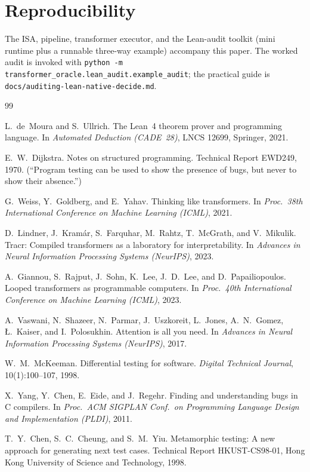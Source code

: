 \documentclass[11pt]{article}
\theoremstyle{definition}
\theoremstyle{plain}
\theoremstyle{remark}
\begin{document}
\section*{Reproducibility}
The ISA, pipeline, transformer executor, and the Lean-audit toolkit (mini runtime plus a runnable
three-way example) accompany this paper. The worked audit is invoked with
\texttt{python -m transformer\_oracle.lean\_audit.example\_audit}; the practical guide is
\texttt{docs/auditing-lean-native-decide.md}.

\begin{thebibliography}{99}

 L.~de~Moura and S.~Ullrich.
  The Lean~4 theorem prover and programming language.
  In \emph{Automated Deduction (CADE~28)}, LNCS 12699, Springer, 2021.

 E.~W.~Dijkstra.
  Notes on structured programming. Technical Report EWD249, 1970.
  (``Program testing can be used to show the presence of bugs, but never to show their absence.'')

 G.~Weiss, Y.~Goldberg, and E.~Yahav.
  Thinking like transformers.
  In \emph{Proc.\ 38th International Conference on Machine Learning (ICML)}, 2021.

 D.~Lindner, J.~Kram\'ar, S.~Farquhar, M.~Rahtz, T.~McGrath, and V.~Mikulik.
  Tracr: Compiled transformers as a laboratory for interpretability.
  In \emph{Advances in Neural Information Processing Systems (NeurIPS)}, 2023.

 A.~Giannou, S.~Rajput, J.~Sohn, K.~Lee, J.~D.~Lee, and D.~Papailiopoulos.
  Looped transformers as programmable computers.
  In \emph{Proc.\ 40th International Conference on Machine Learning (ICML)}, 2023.

 A.~Vaswani, N.~Shazeer, N.~Parmar, J.~Uszkoreit, L.~Jones, A.~N.~Gomez,
  \L.~Kaiser, and I.~Polosukhin.
  Attention is all you need.
  In \emph{Advances in Neural Information Processing Systems (NeurIPS)}, 2017.

 W.~M.~McKeeman.
  Differential testing for software.
  \emph{Digital Technical Journal}, 10(1):100--107, 1998.

 X.~Yang, Y.~Chen, E.~Eide, and J.~Regehr.
  Finding and understanding bugs in C compilers.
  In \emph{Proc.\ ACM SIGPLAN Conf.\ on Programming Language Design and Implementation (PLDI)}, 2011.

 T.~Y.~Chen, S.~C.~Cheung, and S.~M.~Yiu.
  Metamorphic testing: A new approach for generating next test cases.
  Technical Report HKUST-CS98-01, Hong Kong University of Science and Technology, 1998.


\end{thebibliography}
\end{document}
